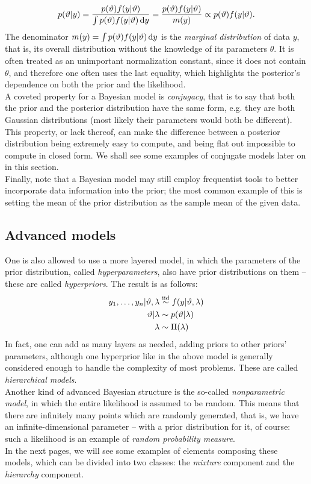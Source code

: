 $$ p(\vartheta|y) = \frac{p(\vartheta) f(y|\vartheta)}{\int p(\vartheta) f(y|\vartheta) \, \mathrm d y} =
\frac{p(\vartheta) f(y|\vartheta)}{m(y)} \propto p(\vartheta) f(y|\vartheta).
$$
The denominator $m(y) = \int p(\vartheta) f(y|\vartheta) \, \mathrm d y$ is the \emph{marginal distribution} of data $y$, that is, its overall distribution without the knowledge of its parameters $\theta$.
It is often treated as an unimportant normalization constant, since it does not contain $\theta$, and therefore one often uses the last equality, which highlights the posterior's dependence on both the prior and the likelihood. \\
A coveted property for a Bayesian model is \emph{conjugacy}, that is to say that both the prior and the posterior distribution have the same form, e.g. they are both Gaussian distributions (most likely their parameters would both be different).
This property, or lack thereof, can make the difference between a posterior distribution being extremely easy to compute, and being flat out impossible to compute in closed form.
We shall see some examples of conjugate models later on in this section. \\
Finally, note that a Bayesian model may still employ frequentist tools to better incorporate data information into the prior; the most common example of this is setting the mean of the prior distribution as the sample mean of the given data.

\subsection{Advanced models} %
One is also allowed to use a more layered model, in which the parameters of the prior distribution, called \emph{hyperparameters}, also have prior distributions on them -- these are called \emph{hyperpriors}.
The result is as follows:
\begin{align*}
	y_1, \dots, y_n | \vartheta, \lambda &\stackrel{\text{iid}}{\sim} f(y|\vartheta, \lambda) \\
	\vartheta | \lambda &\sim p(\vartheta|\lambda) \\
	\lambda &\sim \Pi(\lambda)
\end{align*}
In fact, one can add as many layers as needed, adding priors to other priors' parameters, although one hyperprior like in the above model is generally considered enough to handle the complexity of most problems.
These are called \emph{hierarchical models}. \\
Another kind of advanced Bayesian structure is the so-called \emph{nonparametric model}, in which the entire likelihood is assumed to be random.
This means that there are infinitely many points which are randomly generated, that is, we have an infinite-dimensional parameter -- with a prior distribution for it, of course:
such a likelihood is an example of \emph{random probability measure}. \\
In the next pages, we will see some examples of elements composing these models, which can be divided into two classes: the \emph{mixture} component and the \emph{hierarchy} component.


